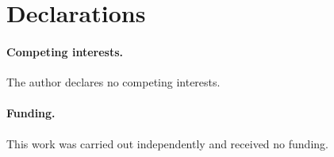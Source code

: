 
\section*{Declarations}

\paragraph{Competing interests.} The author declares no competing interests.

\paragraph{Funding.} This work was carried out independently and received no funding.

